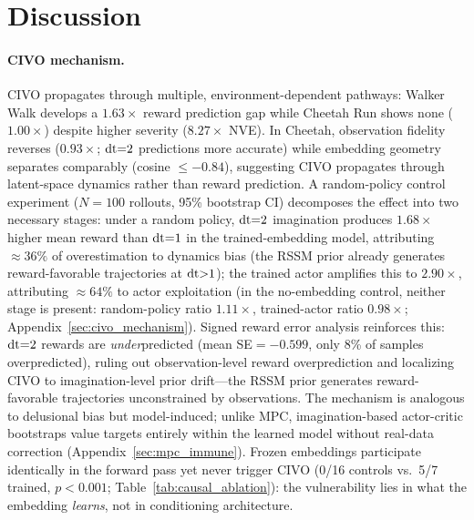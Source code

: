 \section{Discussion}
\label{sec:discussion}

\paragraph{CIVO mechanism.}
 CIVO propagates through multiple, environment-dependent pathways: Walker Walk develops a $1.63\times$ reward prediction gap while Cheetah Run shows none ($1.00\times$) despite higher severity ($8.27\times$ NVE). In Cheetah, observation fidelity reverses ($0.93\times$; $\mathrm{dt}{=}2$ predictions more accurate) while embedding geometry separates comparably (cosine ${\leq}{-}0.84$), suggesting CIVO propagates through latent-space dynamics rather than reward prediction. A random-policy control experiment ($N{=}100$ rollouts, 95\% bootstrap CI) decomposes the effect into two necessary stages: under a random policy, $\mathrm{dt}{=}2$ imagination produces $1.68\times$ higher mean reward than $\mathrm{dt}{=}1$ in the trained-embedding model, attributing ${\approx}36\%$ of overestimation to dynamics bias (the RSSM prior already generates reward-favorable trajectories at $\mathrm{dt}{>}1$); the trained actor amplifies this to $2.90\times$, attributing ${\approx}64\%$ to actor exploitation (in the no-embedding control, neither stage is present: random-policy ratio $1.11\times$, trained-actor ratio $0.98\times$; Appendix~\ref{sec:civo_mechanism}). Signed reward error analysis reinforces this: $\mathrm{dt}{=}2$ rewards are \emph{under}predicted (mean SE${=}{-}0.599$, only 8\% of samples overpredicted), ruling out observation-level reward overprediction and localizing CIVO to imagination-level prior drift---the RSSM prior generates reward-favorable trajectories unconstrained by observations. The mechanism is analogous to delusional bias \citep{lu2018nondelusional} but model-induced; unlike MPC, imagination-based actor-critic bootstraps value targets entirely within the learned model without real-data correction (Appendix~\ref{sec:mpc_immune}). Frozen embeddings participate identically in the forward pass yet never trigger CIVO (0/16 controls vs.\ 5/7 trained, $p < 0.001$; Table~\ref{tab:causal_ablation}): the vulnerability lies in what the embedding \emph{learns}, not in conditioning architecture.

